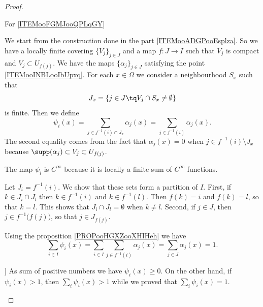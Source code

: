 \begin{proof}
\begin{subproof}
	\end{subproof}

	\begin{proofpart}
		For \ref{ITEMooFGMJooQPLqGY}
	\end{proofpart}

	We start from the construction done in the part \ref{ITEMooADGPooEsplza}. So we have a locally finite covering \( \{ V_j \}_{j\in J}\) and a map \(f \colon J\to I  \) such that \( \bar V_j\) is compact and \( V_j\subset U_{f(j)}\). We have the maps \( \{ \alpha_j \}_{j\in J}\) satisfying the point \ref{ITEMooINBLooIbUpxq}. For each \( x\in \Omega\) we consider a neighbourhood \( S_x\) such that
	\begin{equation}
		J_x=\{ j\in J\tq V_j\cap S_x\neq\emptyset \}
	\end{equation}
	is finite. Then we define
	\begin{equation}
		\psi_i(x)= \sum_{j\in f^{-1}(i)\cap J_x}\alpha_j(x) =\sum_{j\in f^{-1}(i)}\alpha_j(x).
	\end{equation}
	The second equality comes from the fact that \( \alpha_j(x)=0\) when \( j\in  f^{-1}(i)\setminus J_x\) because \( \supp(\alpha_j)\subset V_j\subset U_{f(j)}\).

	\begin{subproof}

		The map \( \psi_i\) is \( C^{\infty}\) because it is locally a finite sum of \( C^{\infty}\) functions.

		\spitem[\( J_i\)]
		Let \( J_i=f^{-1}(i)\). We show that these sets form a partition of \( I\). First, if \( k\in J_i\cap J_l\) then \( k\in f^{-1}(i)\) and \( k\in f^{-1}(l)\). Then \( f(k)=i\) and \( f(k)=l\), so that \( k=l\). This shows that \( J_i\cap J_l=\emptyset\) when \( k\neq l\). Second, if \( j\in J\), then \( j\in f^{-1}\big( f(j) \big)\), so that \( j\in J_{f(j)}\).

		\spitem[\( \sum_i\psi_i=1\)]
		Using the proposition \ref{PROPooHGXZooXHIHeh} we have
		\begin{equation}
			\sum_{i\in I}\psi_i(x)=\sum_{i\in I}\sum_{j\in f^{-1}(i)}\alpha_j(x)=\sum_{j\in J}\alpha_j(x)=1.
		\end{equation}

		\spitem[\( \psi_i(\Omega)\subset\mathopen[ 0,1,\mathclose]\)]
		As sum of positive numbers we have \( \psi_i(x)\geq 0\). On the other hand, if \( \psi_i(x)>1\), then \( \sum_i\psi_i(x)>1\) while we proved that \( \sum_i\psi_i(x)=1\).
	\end{subproof}

\end{proof}
